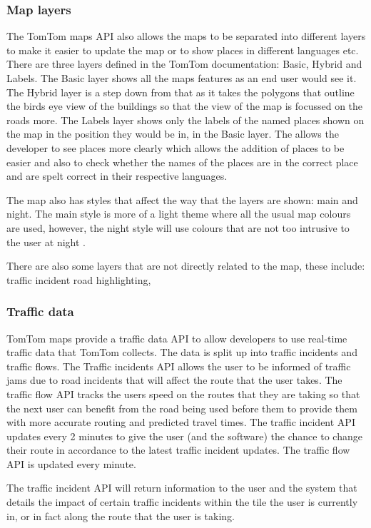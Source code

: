 \documentclass[12pt,a4paper]{article}
\begin{document}
\subsubsection{Map layers}
The TomTom maps API also allows the maps to be separated into different layers to make it easier to update the map or to show places in different languages etc. There are three layers defined in the TomTom documentation: Basic, Hybrid and Labels. The Basic layer shows all the maps features as an end user would see it. The Hybrid layer is a step down from that as it takes the polygons that outline the birds eye view of the buildings so that the view of the map is focussed on the roads more. The Labels layer shows only the labels of the named places shown on the map in the position they would be in, in the Basic layer. The allows the developer to see places more clearly which allows the addition of places to be easier and also to check whether the names of the places are in the correct place and are spelt correct in their respective languages.

The map also has styles that affect the way that the layers are shown: main and night. The main style is more of a light theme where all the usual map colours are used, however, the night style will use colours that are not too intrusive to the user at night \cite{TomTomLayers}.

There are also some layers that are not directly related to the map, these include: traffic incident road highlighting,

\subsubsection{Traffic data}
TomTom maps provide a traffic data API to allow developers to use real-time traffic data that TomTom collects. The data is split up into traffic incidents and traffic flows. The Traffic incidents API allows the user to be informed of traffic jams due to road incidents that will affect the route that the user takes. The traffic flow API tracks the users speed on the routes that they are taking so that the next user can benefit from the road being used before them to provide them with more accurate routing and predicted travel times. The traffic incident API updates every 2 minutes to give the user (and the software) the chance to change their route in accordance to the latest traffic incident updates. The traffic flow API is updated every minute.

The traffic incident API will return information to the user and the system that details the impact of certain traffic incidents within the tile the user is currently in, or in fact along the route that the user is taking. 
\end{document}

